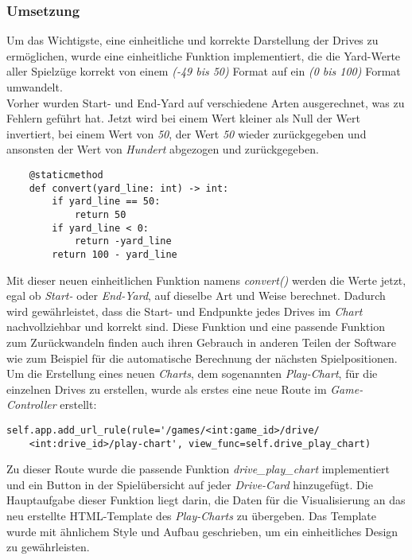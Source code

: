 \subsubsection{Umsetzung}
\vspace*{0.5cm}
Um das Wichtigste, eine einheitliche und korrekte Darstellung der Drives zu ermöglichen, wurde eine einheitliche Funktion implementiert, die die Yard-Werte aller Spielzüge korrekt von einem \textit{(-49 bis 50)} Format auf ein \textit{(0 bis 100)} Format umwandelt.\\ Vorher wurden Start- und End-Yard auf verschiedene Arten ausgerechnet, was zu Fehlern geführt hat.  Jetzt wird bei einem Wert kleiner als Null der Wert invertiert, bei einem Wert von \textit{50}, der Wert \textit{50} wieder zurückgegeben und ansonsten der Wert von \textit{Hundert} abgezogen und zurückgegeben. 
\vspace*{0.5cm}
\begin{verbatim}
    @staticmethod
    def convert(yard_line: int) -> int:
        if yard_line == 50:
            return 50
        if yard_line < 0:
            return -yard_line
        return 100 - yard_line
\end{verbatim}
\vspace*{0.3cm}
Mit dieser neuen einheitlichen Funktion namens \textit{convert()} werden die Werte jetzt, egal ob \textit{Start-} oder \textit{End-Yard}, auf dieselbe Art und Weise berechnet. Dadurch wird gewährleistet, dass die Start- und Endpunkte jedes Drives im \textit{Chart} nachvollziehbar und korrekt sind. Diese Funktion und eine passende Funktion zum Zurückwandeln finden auch ihren Gebrauch in anderen Teilen der Software wie zum Beispiel für die automatische Berechnung der nächsten Spielpositionen.
\\
Um die Erstellung eines neuen \textit{Charts}, dem sogenannten \textit{Play-Chart}, für die einzelnen Drives zu erstellen, wurde als erstes eine neue Route im \textit{Game-Controller} erstellt: 
\vspace*{0.3cm}
\begin{verbatim}
self.app.add_url_rule(rule='/games/<int:game_id>/drive/
    <int:drive_id>/play-chart', view_func=self.drive_play_chart)
\end{verbatim}
\vspace*{0.3cm}
Zu dieser Route wurde die passende Funktion \textit{drive\_play\_chart} implementiert und ein Button in der Spielübersicht auf jeder \textit{Drive-Card} hinzugefügt. Die Hauptaufgabe dieser Funktion liegt darin, die Daten für die Visualisierung an das neu erstellte HTML-Template des \textit{Play-Charts} zu übergeben. Das Template wurde mit ähnlichem Style und Aufbau geschrieben, um ein einheitliches Design zu gewährleisten. 
